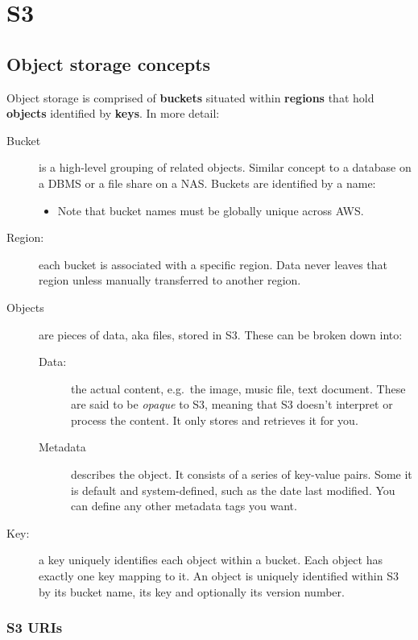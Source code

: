 \chapter{S3}
\label{ch:s3}

\section{Object storage concepts}\label{object-storage-concepts}

Object storage is comprised of \textbf{buckets} situated within \textbf{regions} that hold \textbf{objects} identified by \textbf{keys}.
In more detail:

\begin{description}
\item[Bucket]
is a high-level grouping of related objects. Similar concept to a
database on a DBMS or a file share on a NAS. Buckets are identified by a
name:

\begin{itemize}
\item
  Note that bucket names must be globally unique across AWS.
\end{itemize}
\item[Region:]
  each bucket is associated with a specific region.
  Data never leaves that region unless manually transferred to another region.
\item[Objects]
  are pieces of data, aka files, stored in S3. These can be broken down
  into:
  \begin{description}
  \item[Data:]
    the actual content, e.g.~the image, music file, text document.
    These are said to be \emph{opaque} to S3, meaning that S3 doesn't interpret or process the content.
    It only stores and retrieves it for you.
  \item[Metadata]
    describes the object.
    It consists of a series of key-value pairs.
    Some it is default and system-defined, such as the date last modified.
    You can define any other metadata tags you want.
  \end{description}
\item[Key:]
  a key uniquely identifies each object within a bucket.
  Each object has exactly one key mapping to it.
  An object is uniquely identified within S3 by its bucket name, its key and optionally its version number.
\end{description}

\subsection{S3 URIs}\label{s3-uris}

